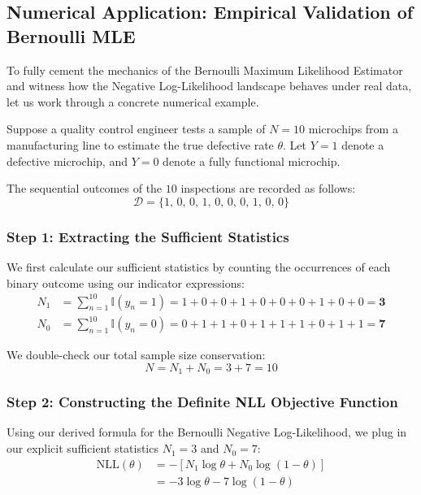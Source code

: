 \documentclass{article}
\begin{document}
\subsection{Numerical Application: Empirical Validation of Bernoulli MLE}

To fully cement the mechanics of the Bernoulli Maximum Likelihood Estimator and witness how the Negative Log-Likelihood landscape behaves under real data, let us work through a concrete numerical example. 

Suppose a quality control engineer tests a sample of $N = 10$ microchips from a manufacturing line to estimate the true defective rate $\theta$. Let $Y = 1$ denote a defective microchip, and $Y = 0$ denote a fully functional microchip. 

The sequential outcomes of the $10$ inspections are recorded as follows:
\begin{equation}
\mathcal{D} = \{1, \, 0, \, 0, \, 1, \, 0, \, 0, \, 0, \, 1, \, 0, \, 0\}
\end{equation}

\subsubsection{Step 1: Extracting the Sufficient Statistics}
We first calculate our sufficient statistics by counting the occurrences of each binary outcome using our indicator expressions:
\begin{align}
N_1 &= \sum_{n=1}^{10} \mathbb{I}(y_n = 1) = 1 + 0 + 0 + 1 + 0 + 0 + 0 + 1 + 0 + 0 = \mathbf{3} \\
N_0 &= \sum_{n=1}^{10} \mathbb{I}(y_n = 0) = 0 + 1 + 1 + 0 + 1 + 1 + 1 + 0 + 1 + 1 = \mathbf{7}
\end{align}

We double-check our total sample size conservation:
\begin{equation}
N = N_1 + N_0 = 3 + 7 = 10
\end{equation}

\subsubsection{Step 2: Constructing the Definite NLL Objective Function}
Using our derived formula for the Bernoulli Negative Log-Likelihood, we plug in our explicit sufficient statistics $N_1 = 3$ and $N_0 = 7$:
\begin{align*}
\text{NLL}(\theta) &= - [N_1 \log \theta + N_0 \log(1 - \theta)] \\
&= -3 \log \theta - 7 \log(1 - \theta)
\end{align*}
\end{document}
